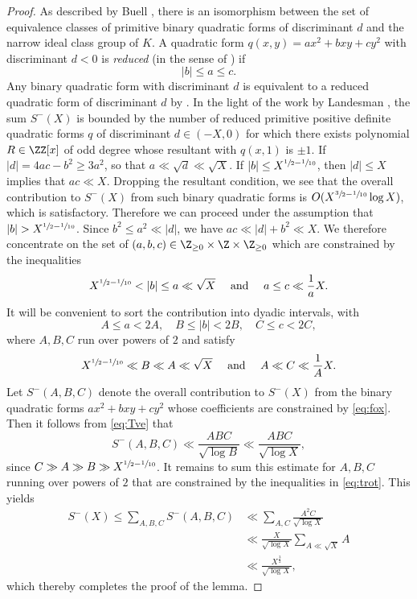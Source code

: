 \begin{proof}
As described by Buell \cite[Prop.\,6.20]{Buell},
there is an isomorphism between the set of equivalence classes of primitive binary quadratic forms of discriminant $d$ and the narrow ideal class group of $K$. A quadratic form $q(x,y)=ax^2+bxy+cy^2$ with discriminant $d<0$ is \emph{reduced} (in the sense of \cite[Eq.\,(2.1)]{Buell}) if
\[
|b|\leq a\leq c.
\]
Any binary quadratic form with
discriminant $d$ is equivalent to a reduced quadratic form of
discriminant $d$ by \cite[Th.\,2.3]{Buell}.
In the light of the work by Landesman \cite[Th.\,1.1]{aaron}, the sum
$S^-(X)$ is bounded by the number of
reduced primitive positive definite quadratic forms $q$ of discriminant $d\in (-X,0)$ for which
there exists
polynomial $R\in \ZZ[x]$ of odd degree whose resultant with $q(x,1)$ is $\pm 1$.
If $|d|=4ac-b^2\geq 3a^2$, so that
$a\ll \sqrt{d}\ll \sqrt{X}$.
If $|b|\leq X^{\sfrac{1}{2}-\sfrac{1}{10}}$, then
$|d|\leq X$ implies that $ac\ll X$.
Dropping the resultant condition, we see that the overall contribution to $S^-(X)$ from
such binary quadratic forms
is $O(X^{\sfrac{3}{2}-\sfrac{1}{10}}\log X)$, which is satisfactory.
Therefore we can proceed under the assumption that $|b|>X^{\sfrac{1}{2}-\sfrac{1}{10}}$.
Since $b^2\leq a^2\ll |d|$, we have $ac\ll|d|+b^2\ll X$.
We therefore concentrate on the set of $(a,b,c)\in \Z_{\geq 0}\times \Z\times \Z_{\geq 0}$ which are constrained by the inequalities
\[
X^{\sfrac{1}{2}-\sfrac{1}{10}}<|b|\leq a\ll \sqrt{X}\quad \text{ and }\quad a\leq c\ll \frac{1}{a}X.
\]
It will be convenient to sort the contribution into dyadic intervals, with
\begin{equation}\label{eq:fox}
A\leq a<2A,\quad B\leq |b|<2B,\quad C\leq c<2C,
\end{equation}
where $A,B,C$ run over powers of $2$ and satisfy
\begin{equation}\label{eq:trot}
X^{\sfrac{1}{2}-\sfrac{1}{10}}\ll B\ll A\ll\sqrt{X}\quad \text{ and }\quad A\ll C\ll \frac{1}{A}X.
\end{equation}
Let $S^-(A,B,C)$ denote the overall contribution to $S^-(X)$ from the binary quadratic forms
$ax^2+bxy+cy^2$ whose coefficients are constrained by \eqref{eq:fox}.
Then it follows from \eqref{eq:Tve}
that
\[
S^-(A,B,C)\ll \frac{ABC}{\sqrt{\log B}}\ll
\frac{ABC}{\sqrt{\log X}},
\]
since $C\gg A\gg B\gg X^{\sfrac{1}{2}-\sfrac{1}{10}}$.
It remains to sum this estimate for
$A,B,C$ running over powers of $2$ that are constrained by the
inequalities in \eqref{eq:trot}. This yields
\begin{align*}
S^-(X)\leq \sum_{A,B,C} S^-(A,B,C)
&\ll \sum_{A,C}
\frac{A^2C}{\sqrt{\log X}}\\
&\ll \frac{X}{\sqrt{\log X}}
\sum_{A\ll \sqrt{X}}
A\\
&\ll \frac{X^{\frac{3}{2}}}{\sqrt{\log X}},
\end{align*}
which thereby completes the proof of the lemma.
\end{proof}


